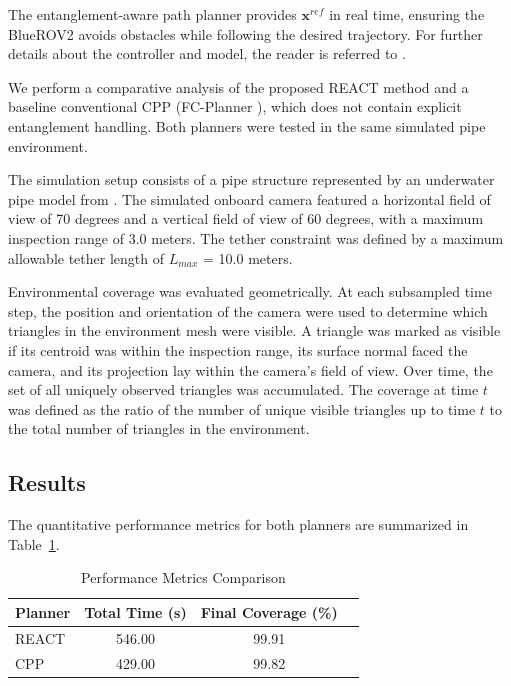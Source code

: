 The entanglement-aware path planner provides $\mathbf{x}^{ref}$ in real time, ensuring the BlueROV2 avoids obstacles while following the desired trajectory. For further details about the controller and model, the reader is referred to \cite{amergp}.

We perform a comparative analysis of the proposed \ac{REACT} method and a baseline conventional \ac{CPP} (FC-Planner \cite{feng2024fc}), which does not contain explicit entanglement handling. Both planners were tested in the same simulated pipe environment.

The simulation setup consists of a pipe structure represented by an underwater pipe model from \cite{feng2024fc}. The simulated onboard camera featured a horizontal field of view of 70 degrees and a vertical field of view of 60 degrees, with a maximum inspection range of 3.0 meters. The tether constraint was defined by a maximum allowable tether length of $L_{max}$ = 10.0 meters.

Environmental coverage was evaluated geometrically. At each subsampled time step, the position and orientation of the camera were used to determine which triangles in the environment mesh were visible. A triangle was marked as visible if its centroid was within the inspection range, its surface normal faced the camera, and its projection lay within the camera's field of view. Over time, the set of all uniquely observed triangles was accumulated. The coverage at time $t$ was defined as the ratio of the number of unique visible triangles up to time $t$ to the total number of triangles in the environment.


\subsection{Results}

The quantitative performance metrics for both planners are summarized in Table~\ref{tab:performance_metrics}.

\begin{table}[ht]
    \centering
    \caption{Performance Metrics Comparison}
    \label{tab:performance_metrics}
    \begin{tabular}{|l|c|c|c|}
        \hline
        \textbf{Planner} & \textbf{Total Time (s)}  & \textbf{Final Coverage (\%)} \\
        \hline
        \ac{REACT} & 546.00  & 99.91 \\
        CPP  & 429.00  & 99.82 \\
        \hline
    \end{tabular}
    \vspace{0.5em}
\end{table}




